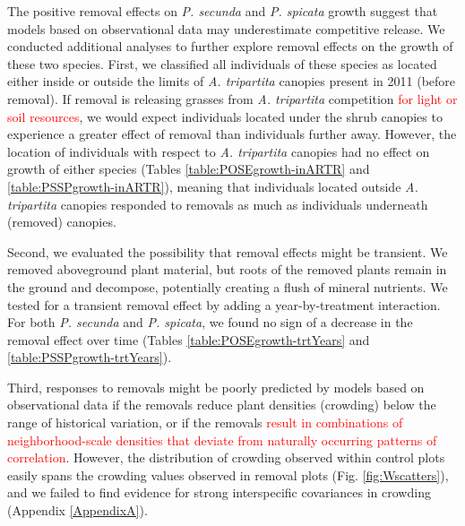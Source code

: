 \documentclass[11pt]{article}
\newcommand{\new}{\textcolor{red}}
\begin{document}
\begin{doublespacing}
The positive removal effects on \textit{P. secunda}  and \textit{P. spicata} growth suggest that models based on observational data may underestimate competitive release. We conducted additional analyses to further explore removal effects on the growth of these two species. First, we classified all individuals of these species as located either inside or outside the limits of \textit{A. tripartita} canopies present in 2011 (before removal). If removal is releasing grasses from \textit{A. tripartita} competition \new{for light or soil resources}, we would expect individuals located under the shrub canopies to experience a greater effect of removal than individuals further away. However, the location of individuals with respect to \textit{A. tripartita} canopies had no effect on growth of either species (Tables \ref{table:POSEgrowth-inARTR} and \ref{table:PSSPgrowth-inARTR}), meaning that individuals located outside \textit{A. tripartita} canopies responded to removals as much as individuals underneath (removed) canopies. 

Second, we evaluated the possibility that removal effects might be transient. We removed aboveground plant material, but roots of the removed plants remain in the ground and decompose, potentially creating a flush of mineral nutrients. We tested for a transient removal effect by adding a year-by-treatment interaction. For both  \textit{P. secunda}  and \textit{P. spicata}, we found no sign of a decrease in the removal effect over time (Tables \ref{table:POSEgrowth-trtYears} and \ref{table:PSSPgrowth-trtYears}).

Third, responses to removals might be poorly predicted by models based on observational data if the removals reduce plant densities (crowding) below the range of historical variation, or if the removals \new{result in combinations of neighborhood-scale densities that deviate from naturally occurring patterns of correlation}. However, the distribution of crowding observed within control plots easily spans the crowding values observed in removal plots (Fig. \ref{fig:Wscatters}), and we failed to find evidence for strong interspecific covariances in crowding (Appendix \ref{AppendixA}).


\end{doublespacing}
\end{document}
